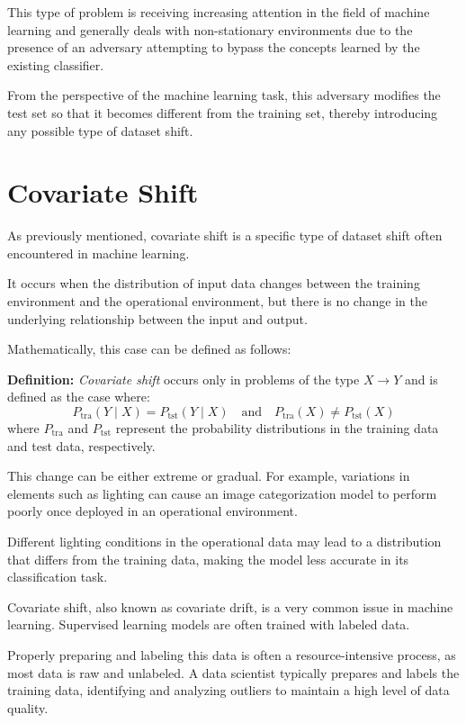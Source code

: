 This type of problem is receiving increasing attention in the field of machine learning and generally deals with non-stationary environments due to the presence of an adversary attempting to bypass the concepts learned by the existing classifier.

From the perspective of the machine learning task, this adversary modifies the test set so that it becomes different from the training set, thereby introducing any possible type of dataset shift.



\section{Covariate Shift}

As previously mentioned, covariate shift is a specific type of dataset shift often encountered in machine learning.

It occurs when the distribution of input data changes between the training environment and the operational environment, but there is no change in the underlying relationship between the input and output.  

Mathematically, this case can be defined as follows:  

\vspace{0.5cm}  
\textbf{Definition:} \textit{Covariate shift} occurs only in problems of the type \(X \to Y\) and is defined as the case where:  
\[
P_{\text{tra}}(Y \mid X) = P_{\text{tst}}(Y \mid X) \quad \text{and} \quad P_{\text{tra}}(X) \neq P_{\text{tst}}(X)
\]
where \(P_{\text{tra}}\) and \(P_{\text{tst}}\) represent the probability distributions in the training data and test data, respectively.  
\vspace{0.5cm}  

This change can be either extreme or gradual. For example, variations in elements such as lighting can cause an image categorization model to perform poorly once deployed in an operational environment.

Different lighting conditions in the operational data may lead to a distribution that differs from the training data, making the model less accurate in its classification task.  

Covariate shift, also known as covariate drift, is a very common issue in machine learning. Supervised learning models are often trained with labeled data.

Properly preparing and labeling this data is often a resource-intensive process, as most data is raw and unlabeled. A data scientist typically prepares and labels the training data, identifying and analyzing outliers to maintain a high level of data quality.

